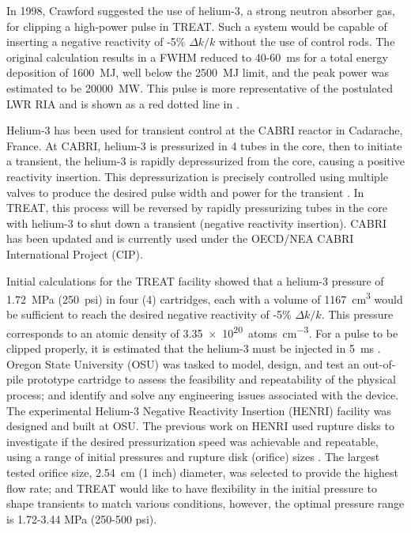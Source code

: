 In 1998, Crawford \cite{Crawford1998} suggested the use of helium-3, a strong neutron absorber gas, for clipping a high-power pulse in TREAT. Such a system would be capable of inserting a negative reactivity of -5\% $\Delta k/k$ without the use of control rods. The original calculation results in a FWHM reduced to 40-\SI{60}{\milli\second} for a total energy deposition of \SI{1600}{\mega\joule}, well below the \SI{2500}{\mega\joule} limit, and the peak power was estimated to be \SI{20000}{\mega\watt}. This pulse is more representative of the postulated LWR RIA and is shown as a red dotted line in .

Helium-3 has been used for transient control at the CABRI reactor in Cadarache, France. At CABRI, helium-3 is pressurized in 4 tubes in the core, then to initiate a transient, the helium-3 is rapidly depressurized from the core, causing a positive reactivity insertion. This depressurization is precisely controlled using multiple valves to produce the desired pulse width and power for the transient \cite{Clamens2016,Clamens2018,Clamens2018b}. In TREAT, this process will be reversed by rapidly pressurizing tubes in the core with helium-3 to shut down a transient (negative reactivity insertion). CABRI has been updated and is currently used under the OECD/NEA CABRI International Project (CIP).

Initial calculations for the TREAT facility showed that a helium-3 pressure of \SI{1.72}{\mega\pascal} (\SI{250}{psi}) in four (4) cartridges, each with a volume of \SI{1167}{\centi\meter^3} would be sufficient to reach the desired negative reactivity of -5\% $\Delta k/k$. This pressure corresponds to an atomic density of \SI{3.35e20}{atoms\per\centi\meter^3}. For a pulse to be clipped properly, it is estimated that the helium-3 must be injected in \SI{5}{\milli\second} \cite{BESS2019}. Oregon State University (OSU) was tasked to model, design, and test an out-of-pile prototype cartridge to assess the feasibility and repeatability of the physical process; and identify and solve any engineering issues associated with the device. The experimental Helium-3 Negative Reactivity Insertion (HENRI) facility was designed and built at OSU. The previous work on HENRI used rupture disks to investigate if the desired pressurization speed was achievable and repeatable, using a range of initial pressures and rupture disk (orifice) sizes \cite{HeNURETH}. The largest tested orifice size, \SI{2.54}{\centi\meter} (1 inch) diameter, was selected to provide the highest flow rate; and TREAT would like to have flexibility in the initial pressure to shape transients to match various conditions, however, the optimal pressure range is 1.72-3.44 \si{\mega\pascal} (250-500 psi).




